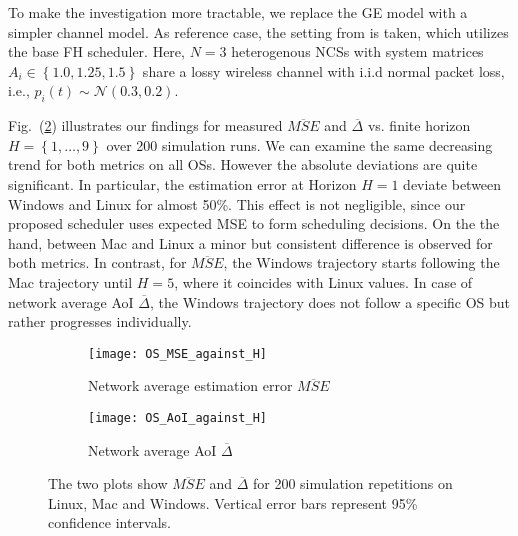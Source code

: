 To make the investigation more tractable, we replace the GE model with a simpler
channel model. As reference case, the setting from \cite{ayan2020aoi} is taken,
which utilizes the base FH scheduler. Here, $N=3$ heterogenous NCSs with system
matrices $A_i\in\left\{1.0, 1.25, 1.5 \right\}$ share a lossy wireless channel
with i.i.d normal packet loss, i.e., $p_i(t) \sim \mathcal{N}(0.3,0.2)$. 

Fig.~(\ref{fig:observation}) illustrates our findings for measured
$\overline{MSE}$ and $\overline{\Delta}$ vs. finite horizon $H=\left\{1, \dots,
9\right\}$ over 200 simulation runs. We can examine the same decreasing trend
for both metrics on all OSs. However the absolute deviations are quite
significant. In particular, the estimation error at Horizon $H=1$ deviate
between Windows and Linux for almost 50\%. This effect is not negligible, since
our proposed scheduler uses expected MSE to form scheduling decisions. On the
the hand, between Mac and Linux a minor but consistent difference is observed
for both metrics. In contrast, for $\overline{MSE}$, the Windows trajectory
starts following the Mac trajectory until $H=5$, where it coincides with Linux
values. In case of network average AoI $\overline{\Delta}$, the Windows
trajectory does not follow a specific OS but rather progresses individually.

\begin{figure}[htb]
  \centering
  \begin{subfigure}[b]{0.49\textwidth}
    \centering
    \texttt{[image: OS\_MSE\_against\_H]} 
    \caption{Network average estimation error $\overline{MSE}$}
    \label{fig:osmse}
  \end{subfigure}
  \hfill
  \begin{subfigure}[b]{0.49\textwidth}
    \centering
    \texttt{[image: OS\_AoI\_against\_H]} 
    \caption{Network average AoI $\overline{\Delta}$}
  \end{subfigure}
  \caption[Comparison of network average MSE and AoI for different OS]{The two
  plots show $\overline{MSE}$ and $\overline{\Delta}$ for 200 simulation
  repetitions on Linux, Mac and Windows. Vertical error bars represent 95\%
  confidence intervals.}
  \label{fig:observation}
\end{figure}

